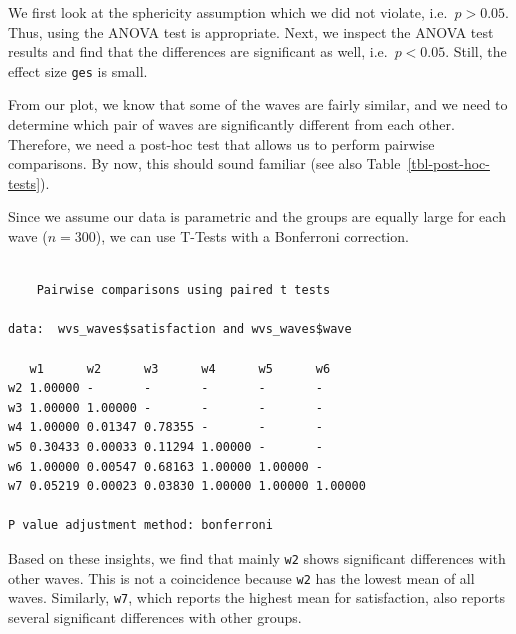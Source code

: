 \documentclass[
  letterpaper,
]{krantz}
\makeatletter
\newenvironment{Shaded}{\begin{snugshade}}{\end{snugshade}}
\newcommand{\AttributeTok}[1]{\textcolor[rgb]{0.40,0.45,0.13}{#1}}
\newcommand{\ConstantTok}[1]{\textcolor[rgb]{0.56,0.35,0.01}{#1}}
\newcommand{\FunctionTok}[1]{\textcolor[rgb]{0.28,0.35,0.67}{#1}}
\newcommand{\NormalTok}[1]{\textcolor[rgb]{0.00,0.23,0.31}{#1}}
\newcommand{\SpecialCharTok}[1]{\textcolor[rgb]{0.37,0.37,0.37}{#1}}
\newcommand{\StringTok}[1]{\textcolor[rgb]{0.13,0.47,0.30}{#1}}
\newenvironment{kframe}{%
\medskip{}
\setlength{\fboxsep}{.8em}
 \def\at@end@of@kframe{}%
 \ifinner\ifhmode%
  \def\at@end@of@kframe{\end{minipage}}%
  \begin{minipage}{\columnwidth}%
 \fi\fi%
 \def\FrameCommand##1{\hskip\@totalleftmargin \hskip-\fboxsep
 \colorbox{shadecolor}{##1}\hskip-\fboxsep
     \hskip-\linewidth \hskip-\@totalleftmargin \hskip\columnwidth}%
 \MakeFramed {\advance\hsize-\width
   \@totalleftmargin\z@ \linewidth\hsize
   \@setminipage}}%
 {\par\unskip\endMakeFramed%
 \at@end@of@kframe}
\renewenvironment{Shaded}{\begin{kframe}}{\end{kframe}}
\makeatother
\begin{document}
We first look at the sphericity assumption which we did not violate,
i.e.~\(p > 0.05\). Thus, using the ANOVA test is appropriate. Next, we
inspect the ANOVA test results and find that the differences are
significant as well, i.e.~\(p < 0.05\). Still, the effect size
\texttt{ges} is small.

From our plot, we know that some of the waves are fairly similar, and we
need to determine which pair of waves are significantly different from
each other. Therefore, we need a post-hoc test that allows us to perform
pairwise comparisons. By now, this should sound familiar (see also
Table~\ref{tbl-post-hoc-tests}).

Since we assume our data is parametric and the groups are equally large
for each wave (\(n = 300\)), we can use T-Tests with a Bonferroni
correction.

\begin{Shaded}
\end{Shaded}

\begin{verbatim}

    Pairwise comparisons using paired t tests 

data:  wvs_waves$satisfaction and wvs_waves$wave 

   w1      w2      w3      w4      w5      w6     
w2 1.00000 -       -       -       -       -      
w3 1.00000 1.00000 -       -       -       -      
w4 1.00000 0.01347 0.78355 -       -       -      
w5 0.30433 0.00033 0.11294 1.00000 -       -      
w6 1.00000 0.00547 0.68163 1.00000 1.00000 -      
w7 0.05219 0.00023 0.03830 1.00000 1.00000 1.00000

P value adjustment method: bonferroni 
\end{verbatim}

Based on these insights, we find that mainly \texttt{w2} shows
significant differences with other waves. This is not a coincidence
because \texttt{w2} has the lowest mean of all waves. Similarly,
\texttt{w7}, which reports the highest mean for satisfaction, also
reports several significant differences with other groups.
\end{document}
